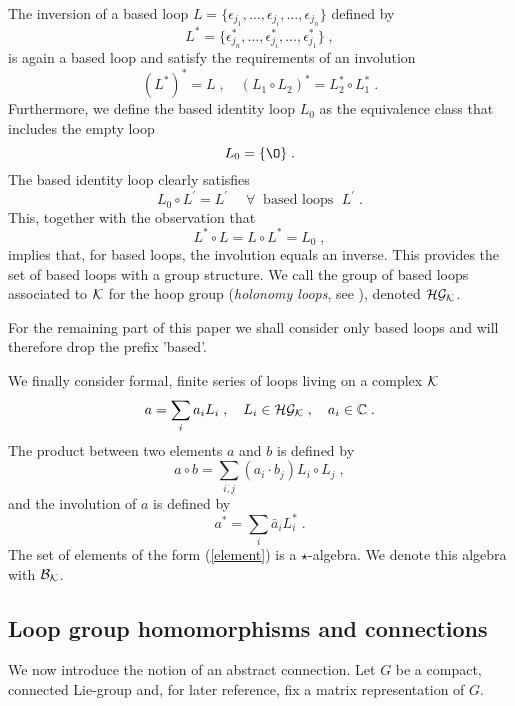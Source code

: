 \documentclass[12pt]{article}
\newcommand{\ba}{\begin{eqnarray}}
\newcommand{\ea}{\end{eqnarray}}
\def\e{\epsilon}
\def\cb{{\cal B}}
\def\cg{{\cal G}}
\def\ch{{\cal H}}
\def\ck{{\cal K}}
\begin{document}
The inversion of a based loop $L=\{\e_{j_1},\ldots,\e_{j_i},\ldots,\e_{j_n}\}$ defined by
\[
L^*=\{\e_{j_n}^*,\ldots,\e_{j_i}^*,\ldots,\e_{j_1}^*\}\;,
\]
is again a based loop and satisfy the requirements of an involution
\[
(L^*)^*=L\;,\quad (L_1\circ L_2)^* = L_2^*\circ L_1^*\;.
\]
Furthermore, we define the based identity loop $L_0$ as the equivalence class that includes the empty loop
\[
L_0 = \{\O\}\;.
\]
The based identity loop clearly satisfies
\[
L_0\circ L^\prime = L^\prime\;\quad\forall\;\; \mbox{based loops }\; L^\prime\;.
\]
This, together with the observation that
\[
L^\ast\circ L = L\circ L^\ast = L_0\;,
\]
implies that, for based loops, the involution equals an inverse. This provides the set of based loops with a group structure. We call the group of based loops associated to $\ck$ for the hoop group ({\it holonomy loops}, see \cite{Ashtekar:1993wf}), denoted $\ch\cg_\ck$. 

For the remaining part of this paper we shall consider only based loops and will therefore drop the prefix 'based'.

We finally consider formal, finite series of loops living on a complex $\ck$
\ba
a =\sum_i a_i L_i\;,\quad L_i\in \ch\cg_\ck\;,\quad a_i\in\mathbb{C}\;.
\label{element}
\ea
The product between two elements $a$ and $b$ is defined by
\[
a\circ b = \sum_{i,j}(a_i\cdot b_j) L_i\circ L_j\;,
\]
and the involution of $a$ is defined by
\[
a^* =\sum_i \bar{a}_i L^*_i\;.
\]
The set of elements of the form (\ref{element}) is a $\star$-algebra. We denote this algebra with $\cb_\ck$.



























\subsection{Loop group homomorphisms and connections}
\label{sec-loop}


We now introduce the notion of an abstract connection. Let $G$ be a compact, connected Lie-group and, for later reference, fix a matrix representation of $G$. 
\end{document}
